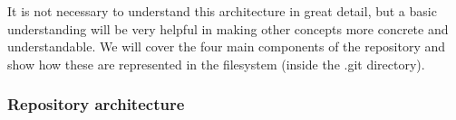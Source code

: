 It is not necessary to understand this architecture in great
detail, but a basic understanding will be very helpful in making
other concepts more concrete and understandable.
We will cover the four main components of the repository and show
how these are represented in the filesystem (inside the .git
directory).

\begin{frame}[fragile,label=architecture]
  \frametitle{Repository architecture}



\end{frame}

